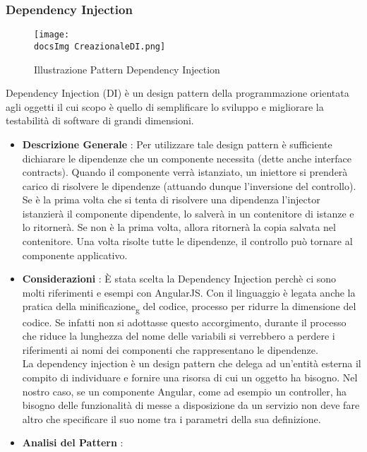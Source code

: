{{		\subsubsection{Dependency Injection}{
			\begin{figure}[ht]
				\centering
				\texttt{[image: \\docsImg CreazionaleDI.png]}
				\caption{Illustrazione Pattern Dependency Injection}
				\label{Illustrazione Pattern Dependency Injection}
			\end{figure}
			Dependency Injection (DI) è un design pattern della programmazione orientata agli oggetti il cui scopo è quello di semplificare lo sviluppo e migliorare la testabilità di software di grandi dimensioni.\\
			\begin{itemize}\itemsep1pt
				\item \textbf{Descrizione Generale} : Per utilizzare tale design pattern è sufficiente dichiarare le dipendenze che un componente necessita (dette anche interface contracts). Quando il componente verrà istanziato, un iniettore si prenderà carico di risolvere le dipendenze (attuando dunque l'inversione del controllo). Se è la prima volta che si tenta di risolvere una dipendenza l'injector istanzierà il componente dipendente, lo salverà in un contenitore di istanze e lo ritornerà. Se non è la prima volta, allora ritornerà la copia salvata nel contenitore. Una volta risolte tutte le dipendenze, il controllo può tornare al componente applicativo.
				\item \textbf{Considerazioni} : È stata scelta la Dependency Injection perchè ci sono molti riferimenti e esempi con AngularJS. Con il linguaggio è legata anche la pratica della minificazione\textsubscript{g} del codice, processo per ridurre la dimensione del codice. Se infatti non si adottasse questo accorgimento, durante il processo che riduce la lunghezza del nome delle variabili si verrebbero a perdere i riferimenti ai nomi dei componenti che rappresentano le dipendenze.\\
				La dependency injection è un design pattern che delega ad un’entità esterna il compito di individuare e fornire una risorsa di cui un oggetto ha bisogno. Nel nostro caso, se un componente Angular, come ad esempio un controller, ha bisogno delle funzionalità di messe a disposizione da un servizio non deve fare altro che specificare il suo nome tra i parametri della sua definizione.
				\item \textbf{Analisi del Pattern} : %
				\small %
				{\renewcommand\arraystretch{1.2} %
}
\end{itemize}}}}
